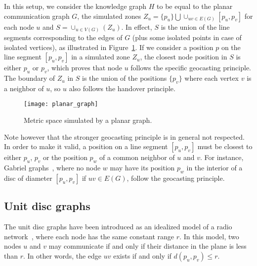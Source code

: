 \documentclass{article}
\begin{document}
In this setup, we consider the knowledge graph $H$ to be equal to the planar communication graph $G$, the simulated zones $Z_u=\{p_u\} \bigcup \cup_{uv\in E(G)}[p_u,p_v]$ for each node $u$ and $S=\cup_{u\in V(G)}(Z_u)$. In effect, $S$ is the union of the line segments corresponding to the edges of $G$ (plus some isolated points in case of isolated vertices), as illustrated in Figure~\ref{fig_planar_graph}. If we consider a position $p$ on the line segment $[p_u,p_v]$ in a simulated zone $Z_u$, the closest node position in $S$ is either $p_u$ or $p_v$, which proves that node $u$ follows the specific geocasting principle. The boundary of $Z_u$ in $S$ is the union of the positions $\{p_v\}$ where each vertex $v$ is a neighbor of $u$, so $u$ also follows the handover principle.

\begin{figure}[h]
\begin{center}
\texttt{[image: planar\_graph]}
\caption{Metric space simulated by a planar graph.}
\label{fig_planar_graph}
\end{center}
\end{figure}

Note however that the stronger geocasting principle is in general not respected. In order to make it valid, a position on a line segment $[p_u,p_v]$ must be closest to either $p_u$, $p_v$ or the position $p_w$ of a common neighbor of $u$ and $v$. For instance, Gabriel graphs~\cite{bib_gabriel}, where no node $w$ may have its position $p_w$ in the interior of a disc of diameter $[p_u,p_v]$ if $uv\in E(G)$, follow the geocasting principle.

\subsection{Unit disc graphs}

The unit disc graphs have been introduced as an idealized model of a radio network~\cite{bib_udg}, where each node has the same constant range $r$. In this model, two nodes $u$ and $v$ may communicate if and only if their distance in the plane is less than $r$. In other words, the edge $uv$ exists if and only if $d(p_u,p_v)\leq r$.
\end{document}
